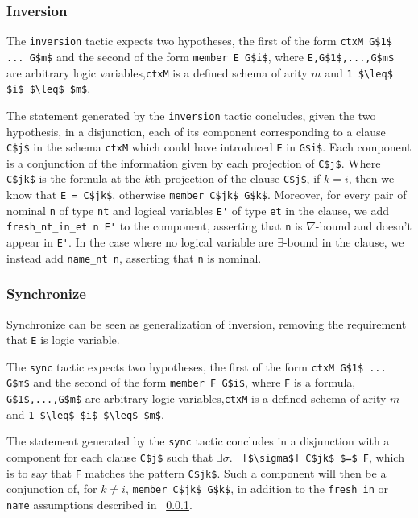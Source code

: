 \documentclass[nocopyrightspace,authoryear]{sigplanconf}
\begin{document}
\subsubsection{Inversion}
\label{subsec:inv}

The \lstinline|inversion| tactic expects two hypotheses, the first of the form \lstinline|ctxM G$1$ ... G$m$| and the second of the form \lstinline|member E G$i$|, where \lstinline|E,G$1$,...,G$m$| are arbitrary logic variables,\lstinline|ctxM| is a defined schema of arity $m$ and \lstinline|1 $\leq$ $i$ $\leq$ $m$|.

The statement generated by the \lstinline|inversion| tactic concludes, given the two hypothesis, in a disjunction, each of its component corresponding to a clause \lstinline|C$j$| in the schema \lstinline|ctxM| which could have introduced \lstinline|E| in \lstinline|G$i$|. Each component is a conjunction of the information given by each projection of \lstinline|C$j$|. Where \lstinline|C$jk$| is the formula at the $k$th projection of the clause \lstinline|C$j$|, if $k=i$, then we know that \lstinline|E = C$jk$|, otherwise \lstinline|member C$jk$ G$k$|. Moreover, for every pair of nominal \lstinline|n| of type \lstinline|nt| and logical variables \lstinline|E'| of type \lstinline|et| in the clause, we add \lstinline|fresh_nt_in_et n E'| to the component, asserting that \lstinline|n| is $\nabla$-bound and doesn't appear in \lstinline|E'|. In the case where no logical variable are $\exists$-bound in the clause, we instead add \lstinline|name_nt n|, asserting that \lstinline|n| is nominal.

\subsubsection{Synchronize}
Synchronize can be seen as generalization of inversion, removing the requirement that \lstinline|E| is logic variable. 

The \lstinline|sync| tactic expects two hypotheses, the first of the form \lstinline|ctxM G$1$ ... G$m$| and the second of the form \lstinline|member F G$i$|, where \lstinline|F| is a formula, \lstinline|G$1$,...,G$m$| are arbitrary logic variables,\lstinline|ctxM| is a defined schema of arity $m$ and \lstinline|1 $\leq$ $i$ $\leq$ $m$|.

The statement generated by the \lstinline|sync| tactic concludes in a disjunction with a component for each clause \lstinline|C$j$| such that $\exists \sigma.$ \lstinline| [$\sigma$] C$jk$ $=$ F|, which is to say that \lstinline|F| matches the pattern \lstinline|C$jk$|. Such a component will then be a conjunction of, for $k \neq i$, \lstinline|member C$jk$ G$k$|, in addition to the \lstinline|fresh_in| or \lstinline|name| assumptions described in ~\ref{subsec:inv}.
\end{document}
